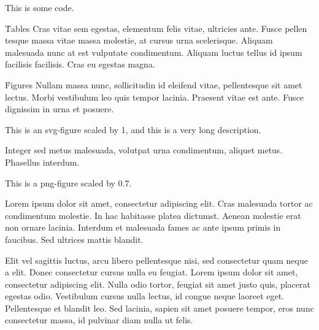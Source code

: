 \documentclass[twocolumn]{paper}
\begin{document}
    {This is some code.}

\h{Tables}
Cras vitae sem egestas, elementum felis vitae, ultricies ante. Fusce pellen tesque massa vitae massa molestie, at cursus urna scelerisque. Aliquam malesuada nunc at est vulputate condimentum. Aliquam luctus tellus id ipsum facilisis facilisis. Cras eu egestas magna.


\h{Figures}
Nullam massa nunc, sollicitudin id eleifend vitae, pellentesque sit amet lectus. Morbi vestibulum leo quis tempor lacinia. Praesent vitae est ante. Fusce dignissim in urna et posuere.

    {This is an svg-figure scaled by 1, and this is a very long description.}

Integer sed metus malesuada, volutpat urna condimentum, aliquet metus. Phasellus interdum.

    {This is a png-figure scaled by 0.7.}


Lorem ipsum dolor sit amet, consectetur adipiscing elit. Cras malesuada tortor ac condimentum molestie. In hac habitasse platea dictumst. Aenean molestie erat non ornare lacinia. Interdum et malesuada fames ac ante ipsum primis in faucibus. Sed ultrices mattis blandit.


Elit vel sagittis luctus, arcu libero pellentesque nisi, sed consectetur quam neque a elit. Donec consectetur cursus nulla eu feugiat. Lorem ipsum dolor sit amet, consectetur adipiscing elit. Nulla odio tortor, feugiat sit amet justo quis, placerat egestas odio. Vestibulum cursus nulla lectus, id congue neque laoreet eget. Pellentesque et blandit leo. Sed lacinia, sapien sit amet posuere tempor, eros nunc consectetur massa, id pulvinar diam nulla ut felis.
\end{document}
